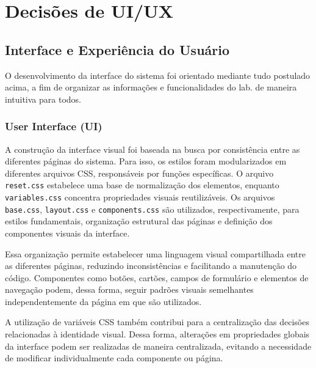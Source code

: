 \vspace{5mm}
\section{Decisões de UI/UX}


\subsection{Interface e Experiência do Usuário}

O desenvolvimento da interface do sistema foi orientado mediante tudo postulado acima, a fim de organizar
as informações e funcionalidades do lab. de maneira intuitiva para todos.

\subsubsection{User Interface (UI)}

A construção da interface visual foi baseada na busca por consistência entre
as diferentes páginas do sistema. Para isso, os estilos foram modularizados
em diferentes arquivos CSS, responsáveis por funções específicas. O arquivo
\texttt{reset.css} estabelece uma base de normalização dos elementos,
enquanto \texttt{variables.css} concentra propriedades visuais reutilizáveis.
Os arquivos \texttt{base.css}, \texttt{layout.css} e
\texttt{components.css} são utilizados, respectivamente, para estilos
fundamentais, organização estrutural das páginas e definição dos componentes
visuais da interface.

Essa organização permite estabelecer uma linguagem visual compartilhada
entre as diferentes páginas, reduzindo inconsistências e facilitando a
manutenção do código. Componentes como botões, cartões, campos de formulário
e elementos de navegação podem, dessa forma, seguir padrões visuais
semelhantes independentemente da página em que são utilizados.

A utilização de variáveis CSS também contribui para a centralização das
decisões relacionadas à identidade visual. Dessa forma, alterações em
propriedades globais da interface podem ser realizadas de maneira
centralizada, evitando a necessidade de modificar individualmente cada
componente ou página.

